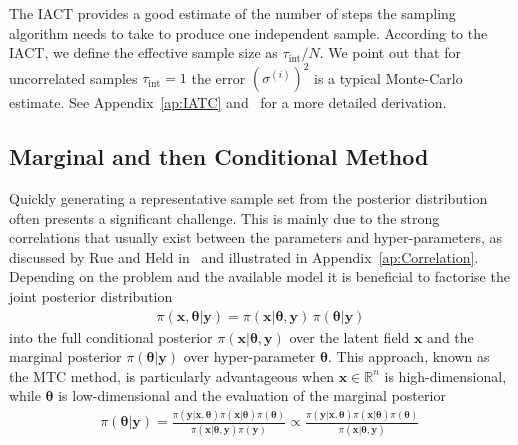 The IACT provides a good estimate of the number of steps the sampling algorithm needs to take to produce one independent sample.
According to the IACT, we define the effective sample size as $ \tau_{\text{int}} /N$.
We point out that for uncorrelated samples $\tau_{\text{int}} = 1$ the error $(\sigma^{(i)})^2$ is a typical Monte-Carlo estimate.
See Appendix~\ref{ap:IATC} and~\cite{Sokal1997, wolff2004monte, wolff2002LecNot} for a more detailed derivation.

\subsection{Marginal and then Conditional Method}
\label{subsec:TheoMTC}
Quickly generating a representative sample set from the posterior distribution often presents a significant challenge. %
This is mainly due to the strong correlations that usually exist between the parameters and hyper-parameters, as discussed by Rue and Held in~\cite{rue2005gaussian} and illustrated in Appendix~\ref{ap:Correlation}.
Depending on the problem and the available model it is beneficial to factorise the joint posterior distribution
\begin{align}
	\pi(\bm{x}, \bm{\theta} |  \bm{y}) = \pi(\bm{x} |  \bm{\theta}, \bm{y}) \, \pi(\bm{\theta} |   \bm{y}) \label{eq:MTC}
\end{align}
into the full conditional posterior $\pi(\bm{x} |  \bm{\theta}, \bm{y})$ over the latent field $\bm{x}$ and the marginal posterior $ \pi(\bm{\theta} |   \bm{y})$ over hyper-parameter $\bm{\theta}$.
This approach, known as the MTC method, is particularly advantageous when $\bm{x}\in \mathbb{R}^n$ is high-dimensional, while $\bm{\theta}$ is low-dimensional and the evaluation of the marginal posterior
\begin{align}
	\pi(\bm{\theta} |   \bm{y}) =  \frac{ \pi(   \bm{y} | \bm{x},\bm{\theta})  \pi( \bm{x} | \bm{\theta} )  \pi(\bm{\theta}) }{ \pi(\bm{x} | \bm{\theta} ,   \bm{y})   \pi( \bm{y})} \propto \frac{ \pi(   \bm{y} | \bm{x},\bm{\theta})  \pi( \bm{x} | \bm{\theta} )  \pi(\bm{\theta}) }{ \pi(\bm{x} | \bm{\theta} ,   \bm{y}) } \label{eq:margGen}\, 
\end{align}
